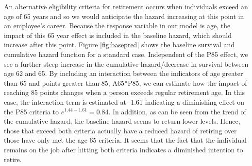\documentclass[12pt,letterpaper]{article}
\begin{document}
An alternative eligibility criteria for retirement occurs when individuals exceed an age of 65 years and so we would anticipate the hazard increasing at this point in an employee's career.  Because the response variable in our model is age, the impact of this 65 year effect is included in the baseline hazard, which should increase after this point.  Figure \ref{fig:basepred} shows the baseline survival and cumulative hazard function for a standard case. Independent of the P85 effect, we see a further steep increase in the cumulative hazard/decrease in survival between age 62 and 65. By including an interaction between the indicators of age greater than 65 and points greater than 85, A65*P85, we can estimate how the impact of reaching 85 points changes when a person exceeds regular retirement age.  In this case, the interaction term is estimated at -1.61 indicating a diminishing effect on the P85 criteria to $e^{1.44-1.61} =0.84$.  In addition, as can be seen from the trend of the cumulative hazard, the baseline hazard seems to return lower levels.  Hence, those that exceed both criteria actually have a reduced hazard of retiring over those have only met the age 65 criteria.  It seems that the fact that the individual remains on the job after hitting both criteria indicates a diminished intention to retire.
\end{document}
